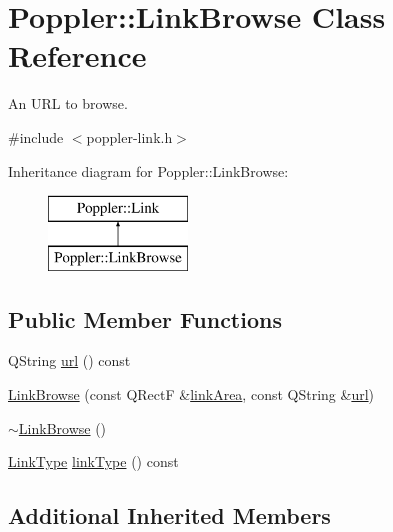\hypertarget{class_poppler_1_1_link_browse}{}\section{Poppler\+:\+:Link\+Browse Class Reference}
\label{class_poppler_1_1_link_browse}


An U\+RL to browse.  




{\ttfamily \#include $<$poppler-\/link.\+h$>$}

Inheritance diagram for Poppler\+:\+:Link\+Browse\+:\begin{figure}[H]
\begin{center}
\leavevmode
\includegraphics[height=2.000000cm]{class_poppler_1_1_link_browse}
\end{center}
\end{figure}
\subsection*{Public Member Functions}
\begin{DoxyCompactItemize}
\item 
Q\+String \hyperlink{class_poppler_1_1_link_browse_acc3885a70d0f74a34260da47a25fe6dc}{url} () const
\item 
\hyperlink{class_poppler_1_1_link_browse_ac468b602d409ba7a9ae3257ced3e5666}{Link\+Browse} (const Q\+RectF \&\hyperlink{class_poppler_1_1_link_adb525b65cfac39dcdba3f59faa57a0bf}{link\+Area}, const Q\+String \&\hyperlink{class_poppler_1_1_link_browse_acc3885a70d0f74a34260da47a25fe6dc}{url})
\item 
\hyperlink{class_poppler_1_1_link_browse_ad67e29fea777807de9baa47132b5ad15}{$\sim$\+Link\+Browse} ()
\item 
\hyperlink{class_poppler_1_1_link_af0dacfa77a548bb043dbae4bb9dc6c1e}{Link\+Type} \hyperlink{class_poppler_1_1_link_browse_a9743123e724e1a4076083cff8b290a31}{link\+Type} () const
\end{DoxyCompactItemize}
\subsection*{Additional Inherited Members}



